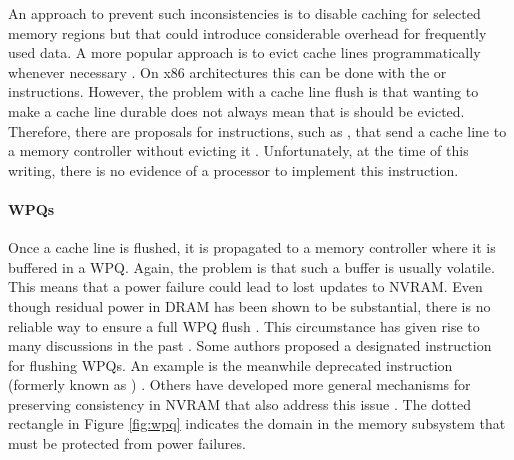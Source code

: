 An approach to prevent such inconsistencies is to disable caching for selected
memory regions but that could introduce considerable overhead for frequently
used data. A more popular approach is to evict cache lines programmatically
whenever necessary \cite{condit2009better, dulloor2014system, oukid2017data}. On
x86 architectures this can be done with the  or 
instructions. However, the problem with a cache line flush is that wanting to
make a cache line durable does not always mean that is should be evicted.
Therefore, there are proposals for instructions, such as , that send
a cache line to a memory controller without evicting it \cite{kolli2016high,
oukid2017data}. Unfortunately, at the time of this writing, there is no evidence
of a processor to implement this instruction.

\paragraph{\acp{WPQ}}

Once a cache line is flushed, it is propagated to a memory controller where it
is buffered in a \ac{WPQ}. Again, the problem is that such a buffer is usually
volatile. This means that a power failure could lead to lost updates to
\ac{NVRAM}. Even though residual power in \ac{DRAM} has been shown to be
substantial, there is no reliable way to ensure a full \ac{WPQ} flush
\cite{halderman2008lest}. This circumstance has given rise to many discussions
in the past \cite{condit2009better, dulloor2014system, kolli2016high}. Some
authors proposed a designated instruction for flushing \acp{WPQ}. An example is
the meanwhile deprecated  instruction (formerly known as
) \cite{dulloor2014system, oukid2015instant,
volos2017whisper}. Others have developed more general mechanisms for preserving
consistency in \ac{NVRAM} that also address this issue \cite{condit2009better,
pelley2014memory}. The dotted rectangle in Figure \ref{fig:wpq} indicates the
domain in the memory subsystem that must be protected from power failures.

